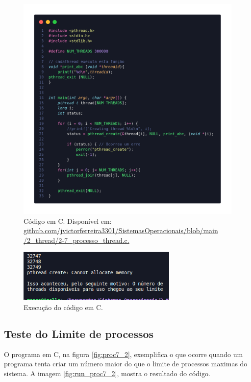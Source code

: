 \documentclass[
	12pt,				%
	openright,			%
	oneside,			%
	a4paper,			%
	chapter=TITLE,		%
	english,			%
	french,				%
	spanish,			%
	brazil				%
	]{abntex2}
\theoremstyle{definition}
\begin{document}
\begin{figure}
    \centering
    \includegraphics[width=0.8 \textwidth]{imagens/processos_7.png}
    \caption{Código em C. Disponível em: \href{https://github.com/jvictorferreira3301/Sistemas_Operacionais/blob/main/2_thread/2-7_processo_thread.c}{github.com/jvictorferreira3301/SistemasOperacionais/blob/main
    /2\_thread/2-7\_processo\_thread.c.}}
    \label{fig:proc7}
\end{figure}

\begin{figure}
    \centering
    \includegraphics[width=0.7\textwidth]{imagens/run_processos_7.png}
    \caption{Execução do código em C.}
    \label{fig:run7_2}
\end{figure}

\subsection{Teste do Limite de processos}
O programa em C, na figura \ref{fig:proc7_2}, exemplifica o que ocorre quando um programa tenta criar um número maior do que o limite de processos maximas do sistema. A imagem  \ref{fig:run_proc7_2}, mostra o resultado do código.
\end{document}
